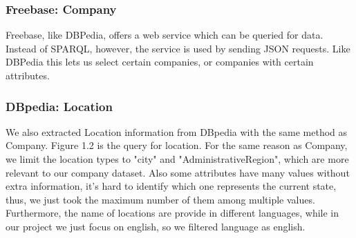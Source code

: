 \subsubsection{Freebase: Company}
Freebase, like DBPedia, offers a web service which can be queried for data. Instead of SPARQL,
however, the service is used by sending JSON requests. Like DBPedia this lets us select certain
companies, or companies with certain attributes.


\subsubsection{DBpedia: Location}
We also extracted Location information from DBpedia with the same method as Company. Figure 1.2 is the query for location. For the same reason as Company, we limit the location types to "city" and "AdministrativeRegion", which are more relevant to our company dataset. Also some attributes have many values without extra information, it's hard to identify which one represents the current state, thus, we just took the maximum number of them among multiple values. Furthermore, the name of locations are provide in different languages, while in our project we just focus on english, so we filtered language as english.


